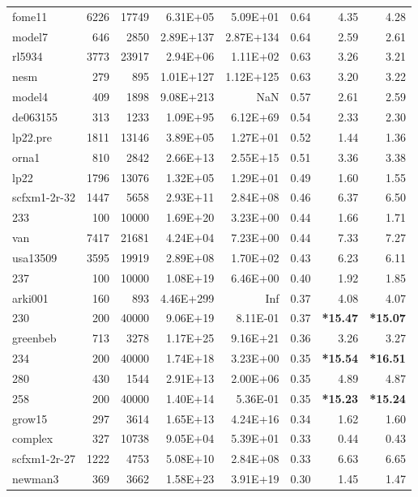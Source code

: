 \documentclass[10pt]{article}
\newcommand{\red}{
	\color{red}	
	}
\begin{document}
\begin{longtable}{|l|r|r|r|r|r|r|r|}
fome11	&	6226	&	17749	&	6.31E+05	&	5.09E+01	&	0.64	&	4.35	&	4.28	\\
model7	&	646	&	2850	&	2.89E+137	&	2.87E+134	&	0.64	&	2.59	&	2.61	\\
rl5934	&	3773	&	23917	&	2.94E+06	&	1.11E+02	&	0.63	&	3.26	&	3.21	\\
nesm	&	279	&	895	&	1.01E+127	&	1.12E+125	&	0.63	&	3.20	&	3.22	\\
model4	&	409	&	1898	&	9.08E+213	&	NaN	&	0.57	&	2.61	&	2.59	\\
de063155	&	313	&	1233	&	1.09E+95	&	6.12E+69	&	0.54	&	2.33	&	2.30	\\
lp22.pre	&	1811	&	13146	&	3.89E+05	&	1.27E+01	&	0.52	&	1.44	&	1.36	\\
orna1	&	810	&	2842	&	2.66E+13	&	2.55E+15	&	0.51	&	3.36	&	3.38	\\
lp22	&	1796	&	13076	&	1.32E+05	&	1.29E+01	&	0.49	&	1.60	&	1.55	\\
scfxm1-2r-32	&	1447	&	5658	&	2.93E+11	&	2.84E+08	&	0.46	&	6.37	&	6.50	\\
233	&	100	&	10000	&	1.69E+20	&	3.23E+00	&	0.44	&	1.66	&	1.71	\\
van	&	7417	&	21681	&	4.24E+04	&	7.23E+00	&	0.44	&	7.33	&	7.27	\\
usa13509	&	3595	&	19919	&	2.89E+08	&	1.70E+02	&	0.43	&	6.23	&	6.11	\\
237	&	100	&	10000	&	1.08E+19	&	6.46E+00	&	0.40	&	1.92	&	1.85	\\
arki001	&	160	&	893	&	4.46E+299	&	Inf	&	0.37	&	4.08	&	4.07	\\
230	&	200	&	40000	&	9.06E+19	&	8.11E-01	&	0.37	&	{\bf \red *15.47} 	&	{\bf \red *15.07}	\\
greenbeb	&	713	&	3278	&	1.17E+25	&	9.16E+21	&	0.36	&	3.26	&	3.27	\\
234	&	200	&	40000	&	1.74E+18	&	3.23E+00	&	0.35	&	{\bf \red *15.54} 	&	{\bf \red *16.51} 	\\
280	&	430	&	1544	&	2.91E+13	&	2.00E+06	&	0.35	&	4.89	&	4.87	\\
258	&	200	&	40000	&	1.40E+14	&	5.36E-01	&	0.35	&	{\bf \red *15.23} 	&	{\bf \red *15.24}	\\
grow15	&	297	&	3614	&	1.65E+13	&	4.24E+16	&	0.34	&	1.62	&	1.60	\\
complex	&	327	&	10738	&	9.05E+04	&	5.39E+01	&	0.33	&	0.44	&	0.43	\\
scfxm1-2r-27	&	1222	&	4753	&	5.08E+10	&	2.84E+08	&	0.33	&	6.63	&	6.65	\\
newman3	&	369	&	3662	&	1.58E+23	&	3.91E+19	&	0.30	&	1.45	&	1.47	\\

\end{longtable}
\end{document}
